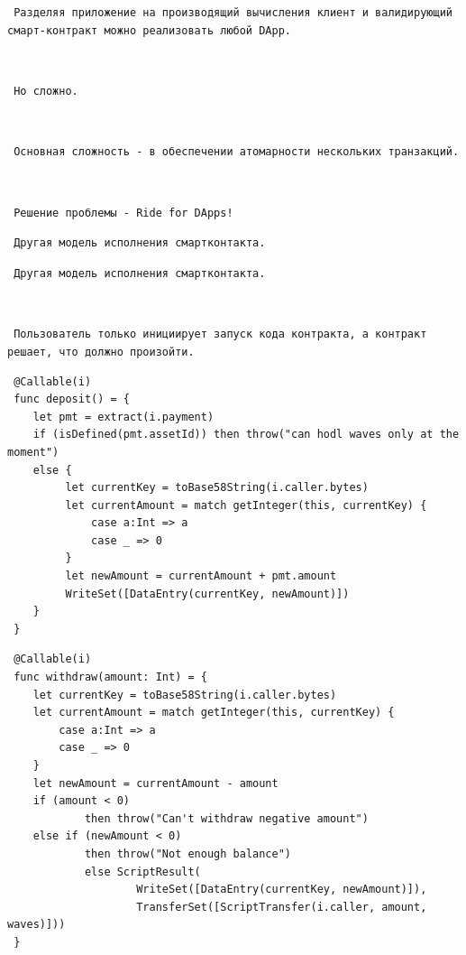 \documentclass[11pt,handout,pdf,hyperref={unicode}]{beamer}
\begin{document}
\begin{frame}[fragile]

\texttt{ Разделяя приложение на производящий вычисления клиент и валидирующий смарт-контракт можно реализовать любой DApp. }

\texttt{ }

\texttt{ Но сложно. }

\texttt{ }

\texttt{ Основная сложность - в обеспечении атомарности нескольких транзакций. }

\texttt{ }

\texttt{ Решение проблемы - Ride for DApps! }

\end{frame}

\begin{frame}[fragile]

\texttt{ Другая модель исполнения смартконтакта. }

\end{frame}

\begin{frame}[fragile]

\texttt{ Другая модель исполнения смартконтакта. }

\texttt{ }

\texttt{ Пользователь только инициирует запуск кода контракта, а контракт решает, что должно произойти. }

\end{frame}

\begin{frame}[fragile]

\begin{verbatim}
 @Callable(i)
 func deposit() = {
    let pmt = extract(i.payment)
    if (isDefined(pmt.assetId)) then throw("can hodl waves only at the moment")
    else {
         let currentKey = toBase58String(i.caller.bytes)
         let currentAmount = match getInteger(this, currentKey) {
             case a:Int => a
             case _ => 0
         }
         let newAmount = currentAmount + pmt.amount
         WriteSet([DataEntry(currentKey, newAmount)])
    }
 }
\end{verbatim}

\end{frame}

\begin{frame}[fragile]

\begin{verbatim}
 @Callable(i)
 func withdraw(amount: Int) = {
    let currentKey = toBase58String(i.caller.bytes)
    let currentAmount = match getInteger(this, currentKey) {
        case a:Int => a
        case _ => 0
    }
    let newAmount = currentAmount - amount
    if (amount < 0)
            then throw("Can't withdraw negative amount")
    else if (newAmount < 0)
            then throw("Not enough balance")
            else ScriptResult(
                    WriteSet([DataEntry(currentKey, newAmount)]),
                    TransferSet([ScriptTransfer(i.caller, amount, waves)]))
 }
\end{verbatim}

\end{frame}
\end{document}
